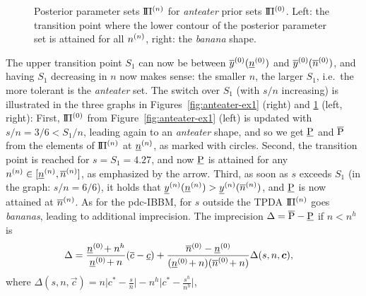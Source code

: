 \begin{figure}%
\caption[Posterior parameter sets $\PN$ for \emph{anteater} prior sets $\PZ$.]%
{Posterior parameter sets $\PN$ for \emph{anteater} prior sets $\PZ$.
Left: the transition point where %
the lower contour of the posterior parameter set 
is attained for all $n^{(n)}$, right: the \emph{banana} shape.}
\label{fig:anteater-ex2}
\end{figure}



The upper transition point $S_1$ can now be between $\overline{y}^{(0)}(\underline{n}^{(0)})$ and $\overline{y}^{(0)}(\overline{n}^{(0)})$, and having
$S_1$ decreasing in $n$ now makes sense: the smaller $n$, the larger $S_1$, i.e.\
the more tolerant is the \emph{anteater} set.
The switch over $S_1$ (with $s/n$ increasing)
is illustrated in the three graphs
in Figures~\ref{fig:anteater-ex1} (right) and \ref{fig:anteater-ex2} (left, right):
First, $\PZ$ from Figure~\ref{fig:anteater-ex1} (left) is updated with
$s/n = 3/6 < S_1/n$, leading again to an \emph{anteater} shape, %
and so we get $\underline{\operatorname{P}}$ and $\overline{\operatorname{P}}$ from the elements of $\PN$ at $\underline{n}^{(n)}$, as marked with circles.
Second, the transition point is reached for $s = S_1 = 4.27$,
and now $\underline{\operatorname{P}}$ is attained for any $n^{(n)} \in [\underline{n}^{(n)}, \overline{n}^{(n)}]$, as emphasized by the arrow.
Third, as soon as $s$ exceeds $S_1$ (in the graph: $s/n = 6/6$),
it holds that $\underline{y}^{(n)}(\underline{n}^{(n)}) > \underline{y}^{(n)}(\overline{n}^{(n)})$, and $\underline{\operatorname{P}}$ is now attained at $\overline{n}^{(n)}$.
As for the pdc-IBBM, for $s$ outside the TPDA $\PN$ goes \emph{bananas},
leading to additional imprecision.
The imprecision $\Delta = \overline{\operatorname{P}} - \underline{\operatorname{P}}$ if $n < n^h$ is
\begin{align*}
\Delta &= \frac{\underline{n}^{(0)}\! + n^h}{\underline{n}^{(0)}\! + n} (\overline{c} - \underline{c}) + \frac{\overline{n}^{(0)} - \underline{n}^{(0)}}{(\underline{n}^{(0)}\! + n)(\overline{n}^{(0)}\! + n)} \Delta(s, n, {\bm c}),
\end{align*}
where $\Delta(s, n, \vec{c}) = n \big|c^* - \frac{s}{n} \big| - n^h \big| c^* - \frac{s^h}{n^h} \big|$,
